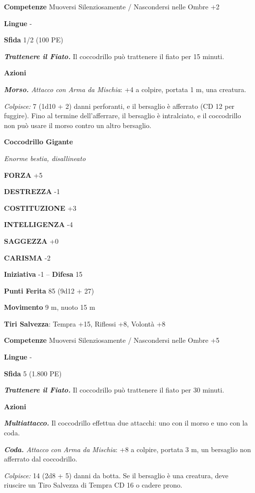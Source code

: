 \begin{multicols}{2}
\textbf{Competenze} Muoversi Silenziosamente / Nascondersi nelle Ombre +2

\textbf{Lingue} -

\textbf{Sfida} 1/2 (100 PE)

\emph{\textbf{Trattenere il Fiato.}} Il coccodrillo può trattenere il fiato per 15 minuti.

\textbf{Azioni}

\emph{\textbf{Morso.} Attacco con Arma da Mischia}: +4 a colpire, portata 1 m, una creatura.

\emph{Colpisce:} 7 (1d10 + 2) danni perforanti, e il bersaglio è afferrato (CD 12 per fuggire). Fino al termine dell'afferrare, il bersaglio è intralciato, e il coccodrillo non può usare il morso contro un altro bersaglio.

\medskip\textbf{Coccodrillo Gigante}

\emph{Enorme bestia, disallineato}

\textbf{FORZA} +5

\textbf{DESTREZZA} -1

\textbf{COSTITUZIONE} +3

\textbf{INTELLIGENZA} -4

\textbf{SAGGEZZA} +0

\textbf{CARISMA} -2

\textbf{Iniziativa} -1 -- \textbf{Difesa} 15

\textbf{Punti Ferita} 85 (9d12 + 27)

\textbf{Movimento} 9 m, nuoto 15 m

\textbf{Tiri Salvezza}: Tempra +15, Riflessi +8, Volontà +8

\textbf{Competenze} Muoversi Silenziosamente / Nascondersi nelle Ombre +5

\textbf{Lingue} -

\textbf{Sfida} 5 (1.800 PE)

\emph{\textbf{Trattenere il Fiato.}} Il coccodrillo può trattenere il fiato per 30 minuti.

\textbf{Azioni}

\emph{\textbf{Multiattacco.}} Il coccodrillo effettua due attacchi: uno con il morso e uno con la coda.

\emph{\textbf{Coda.} Attacco con Arma da Mischia}: +8 a colpire, portata 3 m, un bersaglio non afferrato dal coccodrillo.

\emph{Colpisce:} 14 (2d8 + 5) danni da botta. Se il bersaglio è una creatura, deve riuscire un Tiro Salvezza di Tempra CD 16 o cadere prono.


\end{multicols}
